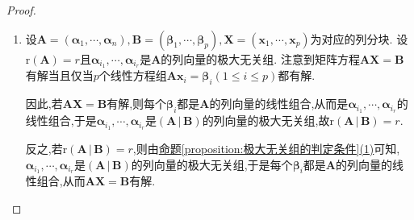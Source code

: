 \documentclass[../../main.tex]{subfiles}
\begin{document}
\begin{proof}
\begin{enumerate}
\item 设\(\boldsymbol{A}=(\boldsymbol{\alpha}_1,\cdots,\boldsymbol{\alpha}_n),\boldsymbol{B}=(\boldsymbol{\beta}_1,\cdots,\boldsymbol{\beta}_p),\boldsymbol{X}=(\boldsymbol{x}_1,\cdots,\boldsymbol{x}_p)\)为对应的列分块. 设\(\mathrm{r}(\boldsymbol{A}) = r\)且\(\boldsymbol{\alpha}_{i_1},\cdots,\boldsymbol{\alpha}_{i_r}\)是\(\boldsymbol{A}\)的列向量的极大无关组. 注意到矩阵方程\(\boldsymbol{A}\boldsymbol{X}=\boldsymbol{B}\)有解当且仅当\(p\)个线性方程组\(\boldsymbol{A}\boldsymbol{x}_i=\boldsymbol{\beta}_i(1\leq i\leq p)\)都有解. 

因此,若\(\boldsymbol{A}\boldsymbol{X}=\boldsymbol{B}\)有解,则每个\(\boldsymbol{\beta}_i\)都是\(\boldsymbol{A}\)的列向量的线性组合,从而是\(\boldsymbol{\alpha}_{i_1},\cdots,\boldsymbol{\alpha}_{i_r}\)的线性组合,于是\(\boldsymbol{\alpha}_{i_1},\cdots,\boldsymbol{\alpha}_{i_r}\)是\(\left( \boldsymbol{A}\,|\,\boldsymbol{B} \right)\)的列向量的极大无关组,故\(\mathrm{r}\left( \boldsymbol{A}\,|\,\boldsymbol{B} \right) = r\). 

反之,若\(\mathrm{r}\left( \boldsymbol{A}\,|\,\boldsymbol{B} \right) = r\),则由\hyperref[proposition:极大无关组的判定条件]{命题\ref{proposition:极大无关组的判定条件}(1)}可知,\(\boldsymbol{\alpha}_{i_1},\cdots,\boldsymbol{\alpha}_{i_r}\)是\(\left( \boldsymbol{A}\,|\,\boldsymbol{B} \right)\)的列向量的极大无关组,于是每个\(\boldsymbol{\beta}_i\)都是\(\boldsymbol{A}\)的列向量的线性组合,从而\(\boldsymbol{A}\boldsymbol{X}=\boldsymbol{B}\)有解.


\end{enumerate}
\end{proof}
\end{document}
